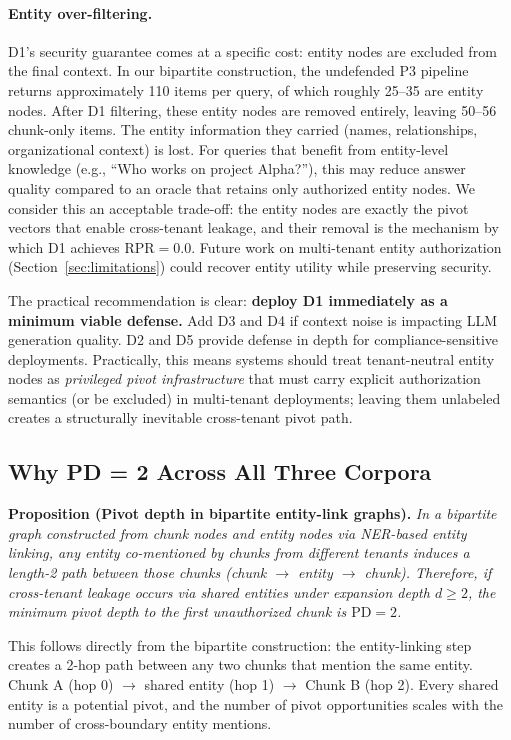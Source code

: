\documentclass[letterpaper,twocolumn,10pt]{article}
\begin{document}
\paragraph{Entity over-filtering.}
D1's security guarantee comes at a specific cost: entity nodes are
excluded from the final context. In our bipartite construction, the
undefended P3 pipeline returns approximately 110 items per query,
of which roughly 25--35 are entity nodes. After D1 filtering, these
entity nodes are removed entirely, leaving 50--56 chunk-only
items. The entity information they carried (names, relationships,
organizational context) is lost. For queries that benefit from
entity-level knowledge (e.g., ``Who works on project Alpha?''), this
may reduce answer quality compared to an oracle that retains only
authorized entity nodes. We consider this an acceptable trade-off:
the entity nodes are exactly the pivot vectors that enable
cross-tenant leakage, and their removal is the mechanism by which
D1 achieves $\text{RPR} = 0.0$. Future work on multi-tenant entity
authorization (Section~\ref{sec:limitations}) could recover entity
utility while preserving security.

The practical recommendation is clear: \textbf{deploy D1 immediately
as a minimum viable defense.} Add D3 and D4 if context noise is
impacting LLM generation quality. D2 and D5 provide defense in
depth for compliance-sensitive deployments. Practically, this means
systems should treat tenant-neutral entity nodes as \emph{privileged
pivot infrastructure} that must carry explicit authorization semantics
(or be excluded) in multi-tenant deployments; leaving them unlabeled
creates a structurally inevitable cross-tenant pivot path.

\subsection{Why PD = 2 Across All Three Corpora}

\textbf{Proposition (Pivot depth in bipartite entity-link graphs).}
\emph{In a bipartite graph constructed from chunk nodes and entity
nodes via NER-based entity linking, any entity co-mentioned by chunks
from different tenants induces a length-2 path between those chunks
(chunk $\to$ entity $\to$ chunk). Therefore, if cross-tenant leakage
occurs via shared entities under expansion depth $d \geq 2$, the
minimum pivot depth to the first unauthorized chunk is
$\text{PD} = 2$.}

This follows directly from the bipartite construction: the
entity-linking step creates a 2-hop path between any two chunks that
mention the same entity. Chunk A (hop 0) $\to$ shared entity (hop 1)
$\to$ Chunk B (hop 2). Every shared entity is a potential pivot, and
the number of pivot opportunities scales with the number of
cross-boundary entity mentions.
\end{document}

